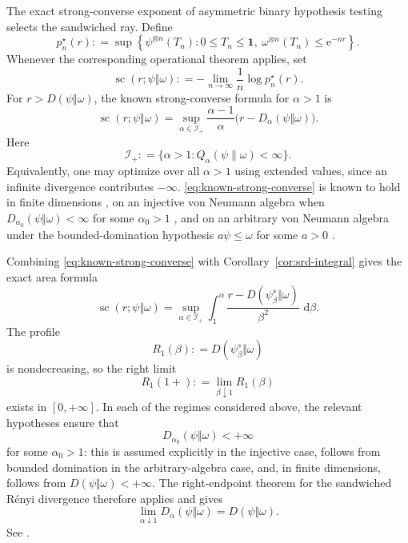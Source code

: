 \documentclass[12pt]{article}
\numberwithin{equation}{section}
\theoremstyle{definition}
\theoremstyle{remark}
\newcommand{\one}{\mathbf 1}
\newcommand{\dd}{\,\mathrm d}
\newcommand{\scal}{\operatorname{sc}}
\newcommand{\?}{\overset{?}{=}}
\newcommand{\defeq}{\mathrel{\mathop:}=}
\newcommand{\e}{\epsilon}
\renewcommand{\e}{\mathrm e}
\begin{document}
The exact strong-converse exponent of asymmetric binary hypothesis testing
selects the sandwiched ray.  Define
\begin{equation}
  p_n^\star(r)
  \defeq \sup\left\{
  \psi^{\otimes n}(T_n):0\leq T_n\leq\one,\ 
  \omega^{\otimes n}(T_n)\leq\e^{-nr}
  \right\}.
  \label{eq:optimal-testing-success}
\end{equation}
Whenever the corresponding operational theorem applies, set
\begin{equation}
  \scal(r;\psi\Vert\omega)
  \defeq -\lim_{n\to\infty}\frac1n\log p_n^\star(r).
\end{equation}
For $r>D(\psi\Vert\omega)$, the known strong-converse formula for $\alpha>1$ is
\begin{equation}
  \scal(r;\psi\Vert\omega)
  =\sup_{\alpha\in\mathcal I_+}
  \frac{\alpha-1}{\alpha}
  \bigl(r-D_\alpha(\psi\Vert\omega)\bigr).
  \label{eq:known-strong-converse}
\end{equation}
Here
\begin{equation}
  \mathcal I_+
  \defeq \{\alpha>1:Q_\alpha(\psi\|\omega)<\infty\}.
  \label{eq:finite-upper-srd-domain}
\end{equation}
Equivalently, one may optimize over all $\alpha>1$ using extended values,
since an infinite divergence contributes $-\infty$. 
\eqref{eq:known-strong-converse} is known to hold in finite dimensions \cite{Mosonyi:2014wsq}, on an injective von Neumann algebra when
$D_{\alpha_0}(\psi\Vert\omega)<\infty$ for some $\alpha_0>1$
\cite{Hiai:2021slp}, and on an arbitrary von Neumann algebra under the
bounded-domination hypothesis $a\psi\leq\omega$ for some  $a>0$ \cite{Junge:2025kuz}.

Combining \eqref{eq:known-strong-converse} with
Corollary~\ref{cor:srd-integral} gives the exact area formula
\begin{equation}
  \scal(r;\psi\Vert\omega)
  =\sup_{\alpha\in\mathcal I_+}
   \int_1^\alpha
   \frac{r-D(\psi_\beta^s\Vert\omega)}{\beta^2}\,\dd\beta .
  \label{eq:strong-converse-area}
\end{equation}
The profile
\[
  R_1(\beta)\defeq D(\psi_\beta^s\Vert\omega)
\]
is nondecreasing, so the right limit
\[
  R_1(1+)\defeq\lim_{\beta\downarrow1}R_1(\beta)
\]
exists in $[0,+\infty]$.  In each of the regimes considered above, the
relevant hypotheses ensure that
\[
  D_{\alpha_0}(\psi\Vert\omega)<+\infty
\]
for some $\alpha_0>1$: this is assumed explicitly in the injective case,
follows from bounded domination in the arbitrary-algebra case, and, in
finite dimensions, follows from $D(\psi\Vert\omega)<+\infty$.  The
right-endpoint theorem for the sandwiched R\'enyi divergence therefore
applies and gives
\begin{equation}
  \lim_{\alpha\downarrow1}
  D_\alpha(\psi\Vert\omega)
  =
  D(\psi\Vert\omega).
  \label{eq:upper-srd-endpoint-operational}
\end{equation}
See \cite{Berta:2016vnw,Jencova:2016tqz,Jencova:2017txf}.
\end{document}
